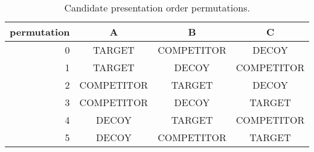 \begin{table}
\caption{Candidate presentation order permutations.}
\label{tab:permutations}
\begin{tabular}{rccc}
\toprule
permutation & A & B & C \\
\midrule
0 & TARGET & COMPETITOR & DECOY \\
1 & TARGET & DECOY & COMPETITOR \\
2 & COMPETITOR & TARGET & DECOY \\
3 & COMPETITOR & DECOY & TARGET \\
4 & DECOY & TARGET & COMPETITOR \\
5 & DECOY & COMPETITOR & TARGET \\
\bottomrule
\end{tabular}
\end{table}
